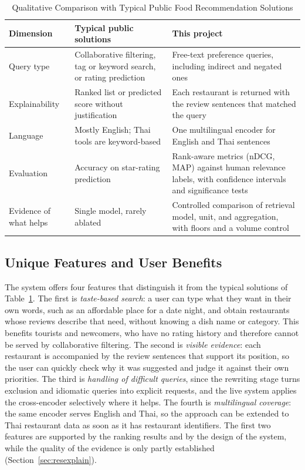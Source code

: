 \begin{table}[htbp]
\centering
\caption{Qualitative Comparison with Typical Public Food Recommendation Solutions}
\label{tab:discexisting}
\small
\begin{tabular}{|p{}|p{}|p{}|}
\hline
\textbf{Dimension} & \textbf{Typical public solutions} & \textbf{This project} \\
\hline
Query type & Collaborative filtering, tag or keyword search, or rating prediction & Free-text preference queries, including indirect and negated ones \\
\hline
Explainability & Ranked list or predicted score without justification & Each restaurant is returned with the review sentences that matched the query \\
\hline
Language & Mostly English; Thai tools are keyword-based & One multilingual encoder for English and Thai sentences \\
\hline
Evaluation & Accuracy on star-rating prediction & Rank-aware metrics (nDCG, MAP) against human relevance labels, with confidence intervals and significance tests \\
\hline
Evidence of what helps & Single model, rarely ablated & Controlled comparison of retrieval model, unit, and aggregation, with floors and a volume control \\
\hline
\end{tabular}
\end{table}

\subsection{Unique Features and User Benefits}
\label{sec:discfeatures}

The system offers four features that distinguish it from the typical solutions of Table~\ref{tab:discexisting}. The first is \emph{taste-based search}: a user can type what they want in their own words, such as an affordable place for a date night, and obtain restaurants whose reviews describe that need, without knowing a dish name or category. This benefits tourists and newcomers, who have no rating history and therefore cannot be served by collaborative filtering. The second is \emph{visible evidence}: each restaurant is accompanied by the review sentences that support its position, so the user can quickly check why it was suggested and judge it against their own priorities. The third is \emph{handling of difficult queries}, since the rewriting stage turns exclusion and idiomatic queries into explicit requests, and the live system applies the cross-encoder selectively where it helps. The fourth is \emph{multilingual coverage}: the same encoder serves English and Thai, so the approach can be extended to Thai restaurant data as soon as it has restaurant identifiers. The first two features are supported by the ranking results and by the design of the system, while the quality of the evidence is only partly established (Section~\ref{sec:resexplain}).

